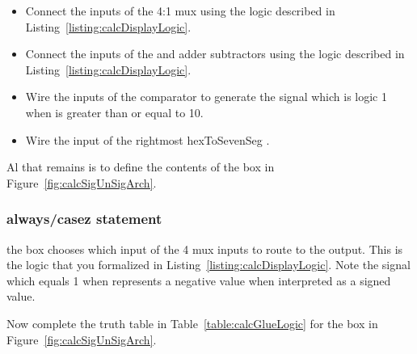     \begin{itemize}
        \item
            Connect the inputs of the 4:1 mux  using the logic described in Listing~\ref{listing:calcDisplayLogic}.
        \item
            Connect the inputs of the and adder subtractors using the logic described in
            Listing~\ref{listing:calcDisplayLogic}.
        \item
            Wire the inputs of the comparator to generate the signal  which is
            logic 1 when  is greater than or equal to 10.
        \item
            Wire the input of the rightmost hexToSevenSeg .
    \end{itemize}

    Al that remains is to define the contents of the  box in Figure~\ref{fig:calcSigUnSigArch}.

    \subsubsection{ always/casez statement}

    the  box chooses which input of the 4 mux inputs to
    route to the output. This is the logic that you formalized in
    Listing~\ref{listing:calcDisplayLogic}.  Note the signal  which equals 1 when 
    represents a negative value when interpreted as a signed value.

    Now complete the truth table in Table~\ref{table:calcGlueLogic} for the  box
    in Figure~\ref{fig:calcSigUnSigArch}.

